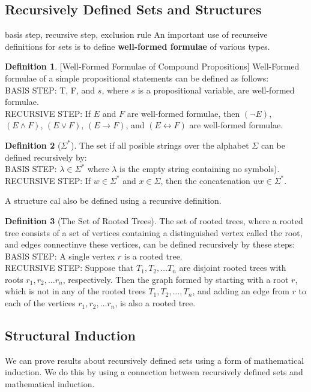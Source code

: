 \documentclass[11pt]{book} %
\theoremstyle {definition}
\newtheorem {definition}{Definition}[section]
\theoremstyle {remark}
\begin{document}
  \subsection {Recursively Defined Sets and Structures}
basis step, recursive step, exclusion rule
An important use of recurseive definitions for sets is to define \textbf{well-formed formulae} of various types.

\begin{definition} \label{WFF} [Well-Formed Formulae of Compound Propositions]  Well-Formed formulae of a simple propositional statements can be defined as follows:\\
BASIS STEP: T, F, and $s$, where $s$ is a propositional variable, are well-formed formulae.\\
RECURSIVE STEP: If $E$ and $F$ are well-formed formulae, then $(\neg E)$, $(E \land F)$, $(E \lor F)$, $(E \rightarrow F)$, and $(E \leftrightarrow F)$ are well-formed formulae.
\end{definition}

\begin{definition}[$\Sigma^*$]
The set if all posible strings over the alphabet $\Sigma$ can be defined recursively by:\\
BASIS STEP: $\lambda \in \Sigma^*$ where $\lambda$
 is the empty string containing no symbols).\\
RECURSIVE STEP: If $w \in \Sigma^*$ and $x \in \Sigma$, then the concatenation $wx \in \Sigma^*$.
\end{definition}

A structure cal also be defined using a recursive definition.

\begin{definition}[The Set of Rooted Trees]
The set of rooted trees, where a rooted tree consists of a set of vertices containing a distinguished vertex called the root, and edges connectinve these vertices, can be defined recursively by these steps:\\
BASIS STEP: A single vertex $r$ is a rooted tree. \\
RECURSIVE STEP: Suppose that $T_1,T_2, \dots T_n$ are disjoint rooted trees with roots $r_1,r_2, \dots r_n$, respectively. Then the graph formed by starting with a root $r$, which is not in any of the rooted trees $T_1,T_2, \dots,T_n$, and adding an edge from $r$ to each of the vertices $r_1,r_2, \dots r_n$, is also a rooted tree.
\end{definition}

  \subsection {Structural Induction}
We can prove results about recursively defined sets using a form of mathematical induction. We do this by using a connection between recursively defined sets and mathematical induction.
\end{document}
